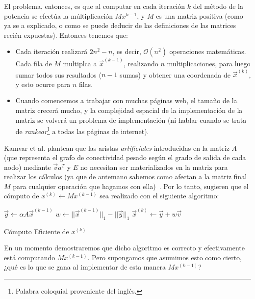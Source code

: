\par El problema, entonces, es que al computar en cada iteraci\'on $k$ del
m\'etodo de la potencia se efect\'ua la m\'ultiplicaci\'on $Mx^{k-1}$, y $M$ es
una matriz positiva (como ya se a explicado, o como se puede deducir de las
definiciones de las matrices reci\'en expuestas). Entonces tenemos que:

\begin{itemize}
    \item Cada iteraci\'on realizar\'a $2n^2-n$, es decir, $\mathcal{O}(n^2)$
        operaciones matem\'aticas. Cada fila de $M$ multiplca a
        $\vec{x}^{(k-1)}$, realizando $n$ multiplicaciones, para luego sumar
        todos sus resultados ($n-1$ sumas) y obtener una coordenada de
        $\vec{x}^{(k)}$, y esto ocurre para $n$ filas.

    \item Cuando comencemos a trabajar con muchas p\'aginas web, el tama\~no de
        la matriz crecer\'a mucho, y la complejidad espacial de la
        implementaci\'on de la matriz se volver\'a un problema de
        implementaci\'on (ni hablar cuando se trata de
        \emph{rankear}\footnote{Palabra coloquial proveniente del ingl\'es.} a
        todas las p\'aginas de internet).
\end{itemize}
\medskip

\par Kamvar et al. plantean que las aristas \emph{artificiales} introducidas en
la matriz $A$ (que representa el grafo de conectividad pesado seg\'un el grado
de salida de cada nodo) mediante $\vec{v}a^T$ y $E$ no necesitan ser
materializados en la matriz para realizar los c\'alculos (ya que de antemano
sabemos como afectan a la matriz final $M$ para cualquier operaci\'on que
hagamos con ella)~\cite[p.262]{Kamvar2003}. Por lo tanto, sugieren que el
c\'omputo de $x^{(k)} \gets Mx^{(k-1)}$ sea realizado con el siguiente
algoritmo:

\begin{algorithm}
    $\vec{y} \gets \alpha A \vec{x}^{(k-1)}$\;
    $w \gets ||\vec{x}^{(k-1)}||_1 - ||\vec{y}||_1$\;
    $\vec{x}^{(k)}\gets \vec{y}+w\vec{v}$\;
    \caption{C\'omputo Eficiente de $x^{(k)}$\cite[p.262]{Kamvar2003}}
    \label{alg:power_method3}
\end{algorithm}

\par En un momento demostraremos que dicho algoritmo es correcto y efectivamente
est\'a computando $Mx^{(k-1)}$. Pero supongamos que asumimos esto como cierto,
¿qu\'e es lo que se gana al implementar de esta manera $Mx^{(k-1)}$?

